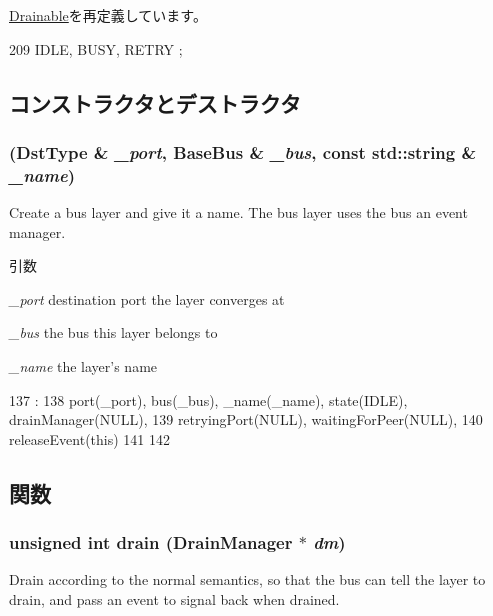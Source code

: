 \hyperlink{classDrainable_a5d74787dedbc4e11c1ab15bf487e61f8}{Drainable}を再定義しています。


\begin{DoxyCode}
209 { IDLE, BUSY, RETRY };
\end{DoxyCode}


\subsection{コンストラクタとデストラクタ}
\hypertarget{classBaseBus_1_1Layer_a1206f14a8687ddf9256407d185fed584}{
\subsubsection[{Layer}]{ (DstType \& {\em \_\-port}, \/  {\bf BaseBus} \& {\em \_\-bus}, \/  const std::string \& {\em \_\-name})}}
\label{classBaseBus_1_1Layer_a1206f14a8687ddf9256407d185fed584}
Create a bus layer and give it a name. The bus layer uses the bus an event manager.


\begin{DoxyParams}{引数}
\item[{\em \_\-port}]destination port the layer converges at \item[{\em \_\-bus}]the bus this layer belongs to \item[{\em \_\-name}]the layer's name \end{DoxyParams}



\begin{DoxyCode}
137                                                                :
138     port(_port), bus(_bus), _name(_name), state(IDLE), drainManager(NULL),
139     retryingPort(NULL), waitingForPeer(NULL),
140     releaseEvent(this)
141 {
142 }

\end{DoxyCode}


\subsection{関数}
\hypertarget{classBaseBus_1_1Layer_aa8a18d230dba7a674ac8a0b4f35bc36a}{
\subsubsection[{drain}]{\setlength{\rightskip}{0pt plus 5cm}unsigned int drain ({\bf DrainManager} $\ast$ {\em dm})}}
\label{classBaseBus_1_1Layer_aa8a18d230dba7a674ac8a0b4f35bc36a}
Drain according to the normal semantics, so that the bus can tell the layer to drain, and pass an event to signal back when drained.



